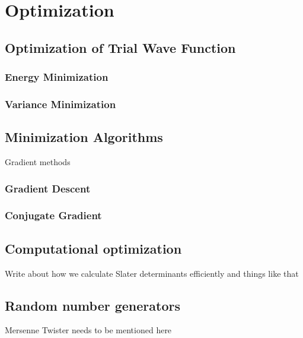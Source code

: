 \chapter{Optimization} \label{chp:optimization}

\section{Optimization of Trial Wave Function}
\subsection{Energy Minimization}
\subsection{Variance Minimization}

\section{Minimization Algorithms}
Gradient methods
\subsection{Gradient Descent}
\subsection{Conjugate Gradient}

\section{Computational optimization}
Write about how we calculate Slater determinants efficiently and things like that

\section{Random number generators} \label{sec:RNG}
Mersenne Twister needs to be mentioned here